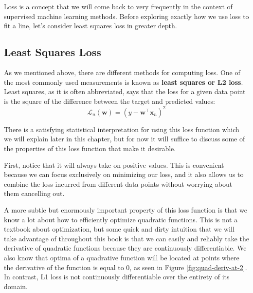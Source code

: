 Loss is a concept that we will come back to very frequently in the context of supervised machine learning methods. Before exploring exactly how we use loss to fit a line, let's consider least squares loss in greater depth.

\subsection{Least Squares Loss}
As we mentioned above, there are different methods for computing loss. One of the most commonly used measurements is known as \textbf{least squares or L2 loss}. Least squares, as it is often abbreviated, says that the loss for a given data point is the square of the difference between the target and predicted values:
\begin{equation} \label{least-squares-loss-fn}
    \mathcal{L}_{n}(\textbf{w}) = (y - \textbf{w}^\top\textbf{x}_{n})^2
\end{equation}


There is a satisfying statistical interpretation for using this loss function which we will explain later in this chapter, but for now it will suffice to discuss some of the properties of this loss function that make it desirable.

First, notice that it will always take on positive values. This is convenient because we can focus exclusively on minimizing our loss, and it also allows us to combine the loss incurred from different data points without worrying about them cancelling out.

A more subtle but enormously important property of this loss function is that we know a lot about how to efficiently optimize quadratic functions. This is not a textbook about optimization, but some quick and dirty intuition that we will take advantage of throughout this book is that we can easily and reliably take the derivative of quadratic functions because they are continuously differentiable. We also know that optima of a quadrative function will be located at points where the derivative of the function is equal to 0, as seen in Figure \ref{fig:quad-deriv-at-2}. In contrast, L1 loss is not continuously differentiable over the entirety of its domain.

